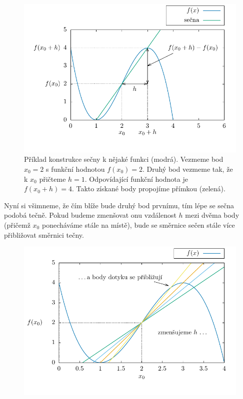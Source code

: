 \begin{figure}[H]
    \centering
    \includegraphics{Gnuplot/cv8/Figures/secna-graf.pdf}
    \caption{Příklad konstrukce sečny k nějaké funkci (modrá). Vezmeme bod $x_0=2$ s funkční hodnotou $f(x_0)=2$. Druhý bod vezmeme tak, že k $x_0$ přičteme $h=1$. Odpovídající funkční hodnota je $f(x_0+h)=4$. Takto získané body propojíme přímkou (zelená).}
\end{figure}

Nyní si všimneme, že čím blíže bude druhý bod prvnímu, tím lépe se sečna podobá tečně. Pokud budeme zmenšovat onu vzdálenost $h$ mezi dvěma body (přičemž $x_0$ ponecháváme stále na místě), bude se směrnice sečen stále více přibližovat směrnici tečny.

\begin{figure}[H]
    \centering
    \includegraphics{Gnuplot/cv8/Figures/priblizovani-graf.pdf}
\end{figure}

